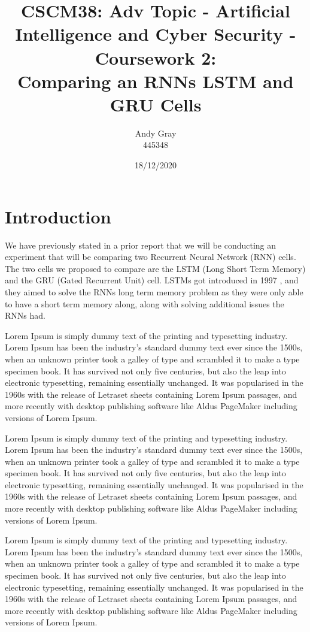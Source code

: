 \documentclass[a4paper,10pt]{article}
\begin{document}
\title{CSCM38: Adv Topic - Artificial Intelligence and Cyber Security - Coursework 2: \\ Comparing an RNNs LSTM and GRU Cells}
\author{Andy Gray\\445348}
\date{18/12/2020}

\maketitle

\section{Introduction}
\label{sec:intro}
	We have previously stated in a prior report that we will be conducting an experiment that will be comparing two Recurrent Neural Network (RNN) cells. The two cells we proposed to compare are the LSTM (Long Short Term Memory) and the GRU (Gated Recurrent Unit) cell. LSTMs got introduced in 1997 \cite{hochreiter1997long}, and they aimed to solve the RNNs long term memory problem as they were only able to have a short term memory along, along with solving additional issues the RNNs had. 

	Lorem Ipsum is simply dummy text of the printing and typesetting industry. Lorem Ipsum has been the industry's standard dummy text ever since the 1500s, when an unknown printer took a galley of type and scrambled it to make a type specimen book. It has survived not only five centuries, but also the leap into electronic typesetting, remaining essentially unchanged. It was popularised in the 1960s with the release of Letraset sheets containing Lorem Ipsum passages, and more recently with desktop publishing software like Aldus PageMaker including versions of Lorem Ipsum.

	Lorem Ipsum is simply dummy text of the printing and typesetting industry. Lorem Ipsum has been the industry's standard dummy text ever since the 1500s, when an unknown printer took a galley of type and scrambled it to make a type specimen book. It has survived not only five centuries, but also the leap into electronic typesetting, remaining essentially unchanged. It was popularised in the 1960s with the release of Letraset sheets containing Lorem Ipsum passages, and more recently with desktop publishing software like Aldus PageMaker including versions of Lorem Ipsum.

	Lorem Ipsum is simply dummy text of the printing and typesetting industry. Lorem Ipsum has been the industry's standard dummy text ever since the 1500s, when an unknown printer took a galley of type and scrambled it to make a type specimen book. It has survived not only five centuries, but also the leap into electronic typesetting, remaining essentially unchanged. It was popularised in the 1960s with the release of Letraset sheets containing Lorem Ipsum passages, and more recently with desktop publishing software like Aldus PageMaker including versions of Lorem Ipsum.
\end{document}
